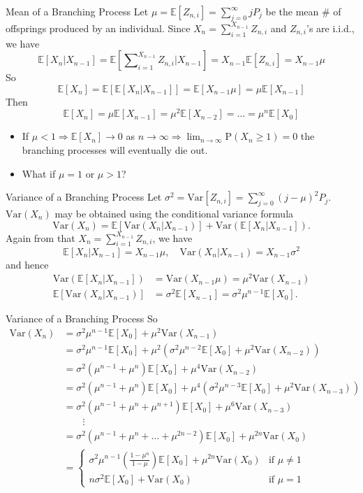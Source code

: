 \documentclass[letterpaper]{beamer}
\def\Sum{\sum\nolimits}
\def\p{\mathrm P}
\def\E{\mathbb E}
\def\V{\mathrm{Var}}
\begin{document}
\begin{frame}{Mean of a Branching Process}
Let $\mu=\E[Z_{n,i}]=\Sum_{j=0}^{\infty}jP_j$ be the mean \# of offsprings produced by an individual.
Since $X_{n} =\Sum_{i=1}^{X_{n-1}}Z_{n,i}$ and $Z_{n,i}$'s are i.i.d., we have
$$
\E[X_{n}|X_{n-1}]=\E\left[\Sum_{i=1}^{X_{n-1}}Z_{n,i}\Big|X_{n-1}\right]=X_{n-1}\E[Z_{n,i}]=X_{n-1}\mu
$$
So
$$
\E[X_{n}]=\E[\E[X_{n}|X_{n-1}]]=\E[X_{n-1}\mu]=\mu\E[X_{n-1}]
$$
Then
$$
\E[X_{n}]=\mu\E[X_{n-1}]=\mu^2\E[X_{n-2}]=\ldots=\mu^n\E[X_{0}]
$$

\vspace{-6pt}
\begin{itemize}
\item If $\mu<1 \Rightarrow \E[X_{n}]\to 0$ as $n\to\infty \Rightarrow \lim_{n\to\infty}\p(X_n\ge1)=0$
the branching processes will eventually die out.
\item What if $\mu=1$ or $\mu>1$?
\end{itemize}
\end{frame}
\begin{frame}{Variance of a Branching Process}
Let $\sigma^2=\V[Z_{n,i}]=\Sum_{j=0}^{\infty}(j-\mu)^2P_j$.
$\V(X_n)$ may be obtained using the conditional variance formula
$$\V(X_{n}) = \E[\V(X_{n}|X_{n-1})] + \V(\E[X_{n}|X_{n-1}]).$$
Again from that $X_{n} =\Sum_{i=1}^{X_{n-1}}Z_{n,i}$, we have
$$
\E[X_{n}|X_{n-1}] = X_{n-1}\mu,\quad \V(X_{n}|X_{n-1}) = X_{n-1}\sigma^2
$$
and hence
\begin{align*}
\V(\E[X_{n}|X_{n-1}]) &= \V(X_{n-1}\mu)=\mu^2\V(X_{n-1})\\
\E[\V(X_{n}|X_{n-1})] &= \sigma^2\E[X_{n-1}]=\sigma^2\mu^{n-1}\E[X_0].
\end{align*}
\end{frame}
\begin{frame}{Variance of a Branching Process}
So
\begin{align*}
\V(X_{n})&=\sigma^2\mu^{n-1}\E[X_0]+\mu^2\V(X_{n-1})\\
&=\sigma^2\mu^{n-1}\E[X_0]+\mu^2(\sigma^2\mu^{n-2}\E[X_0]+\mu^2\V(X_{n-2}))\\
&=\sigma^2(\mu^{n-1}+\mu^n)\E[X_0]+\mu^4\V(X_{n-2})\\
&=\sigma^2(\mu^{n-1}+\mu^n)\E[X_0]+\mu^4(\sigma^2\mu^{n-3}\E[X_0]+\mu^2\V(X_{n-3}))\\
&=\sigma^2(\mu^{n-1}+\mu^n+\mu^{n+1})\E[X_0]+\mu^6\V(X_{n-3})\\
&\qquad\vdots\\
&=\sigma^2(\mu^{n-1}+\mu^{n}+\ldots+\mu^{2n-2})\E[X_0]+\mu^{2n}\V(X_0)\\
&=\begin{cases}
\sigma^2\mu^{n-1}\left(\frac{1-\mu^{n}}{1-\mu}\right)\E[X_0] +\mu^{2n}\V(X_0)& \text{if } \mu\neq1\\
n\sigma^2\E[X_0] + \V(X_0)&\text{if } \mu=1
\end{cases}
\end{align*}
\end{frame}
\end{document}
